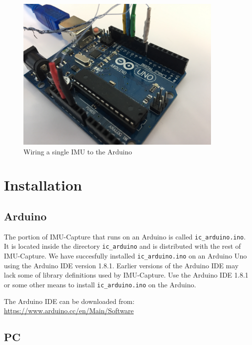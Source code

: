 \documentclass[11pt,letterpaper,article,oneside]{memoir}
\newcommand{\name}{IMU-Capture}
\newcommand{\arduinoFilename}{\texttt{ic\_arduino.ino}}
\newcommand{\arduinoDirectory}{\texttt{ic\_arduino}}
\begin{document}
\begin{figure}[]
    \begin{center}
        \includegraphics[height=3in]{wiring}
    \end{center}
    \label{fig:wiring}
    \caption{Wiring a single IMU to the Arduino}
\end{figure}




\chapter{Installation}

\section{Arduino}
\label{sec:installarduinocode}
The portion of \name{} that runs on an Arduino is called \arduinoFilename{}. It
is located inside the directory \arduinoDirectory{} and is distributed with the
rest of \name{}.  We have succesfully installed \arduinoFilename{} on an Arduino
Uno using the Arduino IDE version 1.8.1. Earlier versions of the Arduino IDE may
lack some of library definitions used by \name{}. Use the Arduino IDE 1.8.1 or
some other means to install \arduinoFilename{} on the Arduino.

The Arduino IDE can be downloaded from:
\url{https://www.arduino.cc/en/Main/Software}


\section{PC}
\label{sec:installPc}
\end{document}
